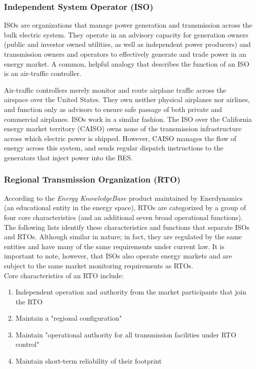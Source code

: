 \subsubsection{Independent System Operator (ISO)}

ISOs are organizations that manage power generation and transmission across the bulk electric system. They operate in an advisory capacity for generation owners (public and investor owned utilities, as well as independent power producers) and transmission owners and operators to effectively generate and trade power in an energy market. A common, helpful analogy that describes the function of an ISO is an air-traffic controller.

Air-traffic controllers merely monitor and route airplane traffic across the airspace over the United States. They own neither physical airplanes nor airlines, and function only as advisors to ensure safe passage of both private and commercial airplanes. ISOs work in a similar fashion. The ISO over the California energy market territory (CAISO) owns none of the transmission infrastructure across which electric power is shipped. However, CAISO manages the flow of energy across this system, and sends regular dispatch instructions to the generators that inject power into the BES.

\subsubsection{Regional Transmission Organization (RTO)}

According to the \textit{Energy KnowledgeBase} product maintained by Enerdynamics (an educational entity in the energy space), RTOs are categorized by a group of four core characteristics (and an additional seven broad operational functions). %
The following lists identify these characteristics and functions that separate ISOs and RTOs. Although similar in nature; in fact, they are regulated by the same entities and have many of the same requirements under current law. It is important to note, however, that ISOs also operate energy markets and are subject to the same market monitoring requirements as RTOs. \\


\noindent Core characteristics of an RTO include:
\begin{enumerate}
    \item{Independent operation and authority from the market participants that join the RTO}
    \item{Maintain a "regional configuration"}
    \item{Maintain "operational authority for all transmission facilities under RTO control"}
    \item{Maintain short-term reliability of their footprint}
\end{enumerate}


